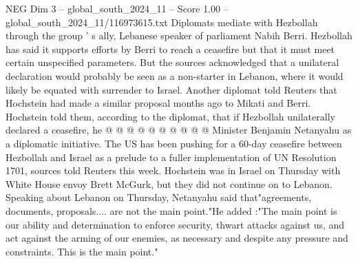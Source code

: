 \begin{textsample}{NEG Dim 3 – global\_south\_2024\_11 – Score 1.00 – global\_south\_2024\_11/116973615.txt}
Diplomats mediate with Hezbollah through the group ' s ally, Lebanese speaker of parliament Nabih Berri.
Hezbollah has said it supports efforts by Berri to reach a ceasefire but that it must meet certain unspecified parameters.
But the sources acknowledged that a unilateral declaration would probably be seen as a non-starter in Lebanon, where it would likely be equated with surrender to Israel.
Another diplomat told Reuters that Hochstein had made a similar proposal months ago to Mikati and Berri.
Hochstein told them, according to the diplomat, that if Hezbollah unilaterally declared a ceasefire, he @ @ @ @ @ @ @ @ @ @ Minister Benjamin Netanyahu as a diplomatic initiative.
The US has been pushing for a 60-day ceasefire between Hezbollah and Israel as a prelude to a fuller implementation of UN Resolution 1701, sources told Reuters this week.
Hochstein was in Israel on Thursday with White House envoy Brett McGurk, but they did not continue on to Lebanon.
Speaking about Lebanon on Thursday, Netanyahu said that"agreements, documents, proposals.... are not the main point."He added :"The main point is our ability and determination to enforce security, thwart attacks against us, and act against the arming of our enemies, as necessary and despite any pressure and constraints.
This is the main point."

\end{textsample}
